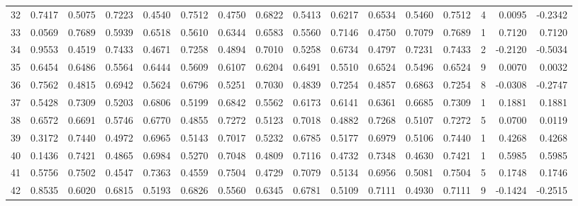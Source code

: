 \begin{tabular}{lrrrrrrrrrrrrrrr}
32  &      0.7417 &  0.5075 &  0.7223 &  0.4540 &  0.7512 &  0.4750 &  0.6822 &  0.5413 &  0.6217 &  0.6534 &   0.5460 &     0.7512 &      4 &                    0.0095 &                    -0.2342 \\
33  &      0.0569 &  0.7689 &  0.5939 &  0.6518 &  0.5610 &  0.6344 &  0.6583 &  0.5560 &  0.7146 &  0.4750 &   0.7079 &     0.7689 &      1 &                    0.7120 &                     0.7120 \\
34  &      0.9553 &  0.4519 &  0.7433 &  0.4671 &  0.7258 &  0.4894 &  0.7010 &  0.5258 &  0.6734 &  0.4797 &   0.7231 &     0.7433 &      2 &                   -0.2120 &                    -0.5034 \\
35  &      0.6454 &  0.6486 &  0.5564 &  0.6444 &  0.5609 &  0.6107 &  0.6204 &  0.6491 &  0.5510 &  0.6524 &   0.5496 &     0.6524 &      9 &                    0.0070 &                     0.0032 \\
36  &      0.7562 &  0.4815 &  0.6942 &  0.5624 &  0.6796 &  0.5251 &  0.7030 &  0.4839 &  0.7254 &  0.4857 &   0.6863 &     0.7254 &      8 &                   -0.0308 &                    -0.2747 \\
37  &      0.5428 &  0.7309 &  0.5203 &  0.6806 &  0.5199 &  0.6842 &  0.5562 &  0.6173 &  0.6141 &  0.6361 &   0.6685 &     0.7309 &      1 &                    0.1881 &                     0.1881 \\
38  &      0.6572 &  0.6691 &  0.5746 &  0.6770 &  0.4855 &  0.7272 &  0.5123 &  0.7018 &  0.4882 &  0.7268 &   0.5107 &     0.7272 &      5 &                    0.0700 &                     0.0119 \\
39  &      0.3172 &  0.7440 &  0.4972 &  0.6965 &  0.5143 &  0.7017 &  0.5232 &  0.6785 &  0.5177 &  0.6979 &   0.5106 &     0.7440 &      1 &                    0.4268 &                     0.4268 \\
40  &      0.1436 &  0.7421 &  0.4865 &  0.6984 &  0.5270 &  0.7048 &  0.4809 &  0.7116 &  0.4732 &  0.7348 &   0.4630 &     0.7421 &      1 &                    0.5985 &                     0.5985 \\
41  &      0.5756 &  0.7502 &  0.4547 &  0.7363 &  0.4559 &  0.7504 &  0.4729 &  0.7079 &  0.5134 &  0.6956 &   0.5081 &     0.7504 &      5 &                    0.1748 &                     0.1746 \\
42  &      0.8535 &  0.6020 &  0.6815 &  0.5193 &  0.6826 &  0.5560 &  0.6345 &  0.6781 &  0.5109 &  0.7111 &   0.4930 &     0.7111 &      9 &                   -0.1424 &                    -0.2515 \\

\end{tabular}
